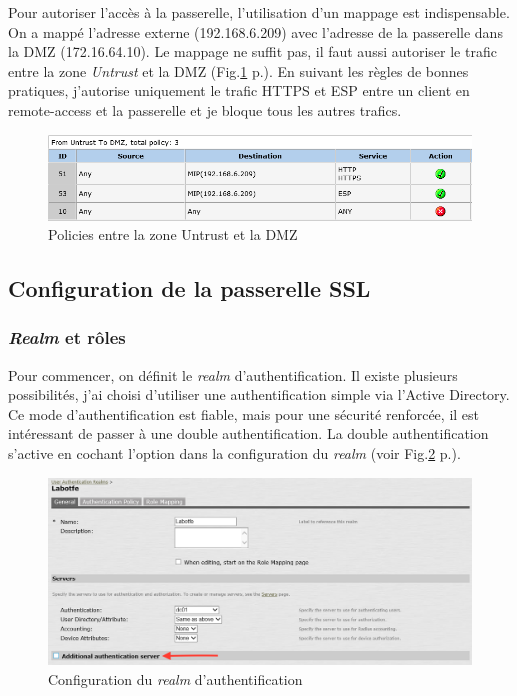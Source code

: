 Pour autoriser l'accès à la passerelle, l'utilisation d'un mappage est indispensable.
On a mappé l'adresse externe (192.168.6.209) avec l'adresse de la passerelle dans la DMZ (172.16.64.10).
Le mappage ne suffit pas, il faut aussi autoriser le trafic entre la zone \textit{Untrust} et la DMZ (Fig.\ref{fig:polUnDMZ} p.\pageref{fig:polUnDMZ}).
En suivant les règles de bonnes pratiques, j'autorise uniquement le trafic HTTPS et ESP entre un client en remote-access et la passerelle et je bloque tous les autres trafics.
\begin{figure}[ht]
	\centering
	\includegraphics[width=16cm]{juniper/Policy-Untrust-DMZ.png}
	\caption{Policies entre la zone Untrust et la DMZ}
	\label{fig:polUnDMZ}
\end{figure}

\subsection{Configuration de la passerelle  SSL}
\subsubsection{\textit{Realm} et rôles}
Pour commencer, on définit le \textit{realm} d'authentification.
Il existe plusieurs possibilités, j'ai choisi d'utiliser une authentification simple via l'Active Directory.
Ce mode d'authentification est fiable, mais pour une sécurité renforcée, il est intéressant de passer à une double authentification.
La double authentification s'active en cochant l'option dans la configuration du \textit{realm} (voir Fig.\ref{fig:confRealm} p.\pageref{fig:confRealm}).
\begin{figure}[ht]
	\centering
	\includegraphics[width=16cm]{juniper/Authserv.png}
	\caption{Configuration du \textit{realm} d'authentification}
	\label{fig:confRealm}
\end{figure}

